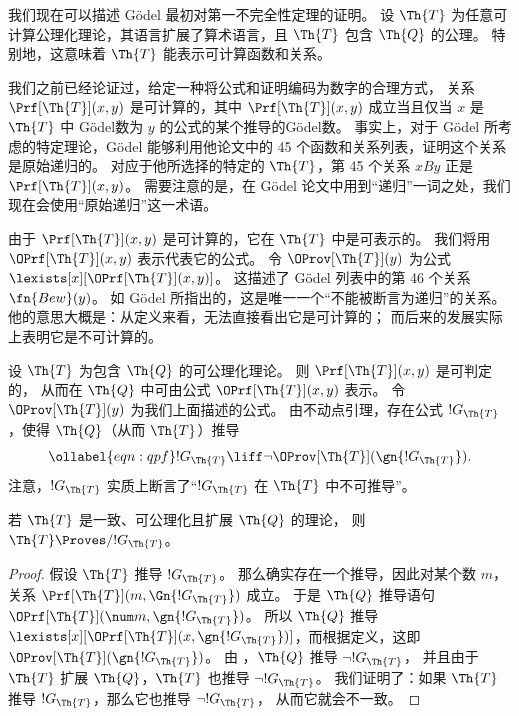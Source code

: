 \documentclass[../../../include/open-logic-section]{subfiles}
\begin{document}


我们现在可以描述 Gödel 最初对第一不完全性定理的证明。
设 $\Th{T}$ 为任意可计算公理化理论，其语言扩展了算术语言，且 $\Th{T}$ 包含 $\Th{Q}$ 的公理。
特别地，这意味着 $\Th{T}$ 能表示可计算函数和关系。

我们之前已经论证过，给定一种将公式和证明编码为数字的合理方式，
关系 $\Prf[\Th{T}](x,y)$ 是可计算的，其中
$\Prf[\Th{T}](x,y)$ 成立当且仅当 $x$ 是 $\Th{T}$ 中
Gödel数为 $y$ 的公式的某个推导的Gödel数。
事实上，对于 Gödel 所考虑的特定理论，Gödel 能够利用他论文中的
45 个函数和关系列表，证明这个关系是原始递归的。
对应于他所选择的特定的 $\Th{T}$，第 45 个关系 $x B y$ 正是 $\Prf[\Th{T}](x,y)$。
需要注意的是，在 Gödel 论文中用到“递归”一词之处，我们现在会使用“原始递归”这一术语。

由于 $\Prf[\Th{T}](x,y)$ 是可计算的，它在 $\Th{T}$ 中是可表示的。
我们将用 $\OPrf[\Th{T}](x,y)$ 表示代表它的公式。
令 $\OProv[\Th{T}](y)$ 为公式 $\lexists[x][\OPrf[\Th{T}](x,y)]$。
这描述了 Gödel 列表中的第 46 个关系 $\fn{Bew}(y)$。
如 Gödel 所指出的，这是唯一一个“不能被断言为递归”的关系。
他的意思大概是：从定义来看，无法直接看出它是可计算的；
而后来的发展实际上表明它是不可计算的。

设 $\Th{T}$ 为包含 $\Th{Q}$ 的可公理化理论。
则 $\Prf[\Th{T}](x, y)$ 是可判定的，
从而在 $\Th{Q}$ 中可由公式 $\OPrf[\Th{T}](x, y)$ 表示。
令 $\OProv[\Th{T}](y)$ 为我们上面描述的公式。
由不动点引理，存在公式 $!G_{\Th{T}}$，使得 $\Th{Q}$（从而 $\Th{T}$）推导
\begin{equation}
\ollabel{eqn:qpf}
!G_{\Th{T}} \liff \lnot \OProv[\Th{T}](\gn{!G_{\Th{T}}}).
\end{equation}
注意，$!G_{\Th{T}}$ 实质上断言了“$!G_{\Th{T}}$ 在 $\Th{T}$ 中不可推导”。

\begin{lem}
若 $\Th{T}$ 是一致、可公理化且扩展 $\Th{Q}$ 的理论，
则 $\Th{T} \Proves/ !G_{\Th{T}}$。
\end{lem}

\begin{proof}
假设 $\Th{T}$ 推导 $!G_{\Th{T}}$。
那么确实存在一个推导，因此对某个数 $m$，关系 $\Prf[\Th{T}](m,
\Gn{!G_{\Th{T}}})$ 成立。
于是 $\Th{Q}$ 推导语句
$\OPrf[\Th{T}](\num m, \gn{!G_{\Th{T}}})$。
所以 $\Th{Q}$ 推导
$\lexists[x][\OPrf[\Th{T}](x,\gn{!G_{\Th{T}}})]$，而根据定义，这即
$\OProv[\Th{T}](\gn{!G_{\Th{T}}})$。
由 ，$\Th{Q}$ 推导 $\lnot !G_{\Th{T}}$，
并且由于 $\Th{T}$ 扩展 $\Th{Q}$，$\Th{T}$ 也推导 $\lnot !G_{\Th{T}}$。
我们证明了：如果 $\Th{T}$ 推导 $!G_{\Th{T}}$，那么它也推导 $\lnot !G_{\Th{T}}$，
从而它就会不一致。
\end{proof}
\end{document}
